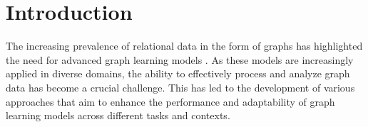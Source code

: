 
\section{Introduction}
\label{sec:Introduction}

The increasing prevalence of relational data in the form of graphs has highlighted the need for advanced graph learning models \cite{feyposition, jin2020graph, xia2024anygraph}. As these models are increasingly applied in diverse domains, the ability to effectively process and analyze graph data has become a crucial challenge. This has led to the development of various approaches that aim to enhance the performance and adaptability of graph learning models across different tasks and contexts.



